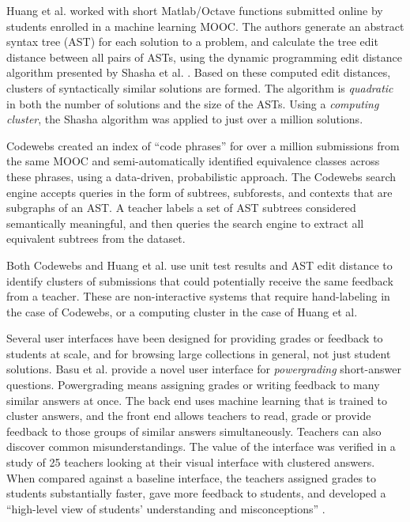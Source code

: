 \documentclass{sigchi}
\begin{document}
Huang et al. \citeyear{MOOCshop} worked with short Matlab/Octave functions submitted online by students enrolled in a machine learning MOOC. The authors generate an abstract syntax tree (AST) for each solution to a problem, and calculate the tree edit distance between all pairs of ASTs, using the dynamic programming edit distance algorithm presented by Shasha et al. \citeyear{shasha1994exact}. Based on these computed edit distances, clusters of syntactically similar solutions are formed. The algorithm is \emph{quadratic} in both the number of solutions and the size of the ASTs. Using a \emph{computing cluster}, the Shasha algorithm was applied to just over a million solutions. 

Codewebs \cite{codewebs} created an index of ``code phrases'' for over a million submissions from the same MOOC and semi-automatically identified equivalence classes across these phrases, using a data-driven, probabilistic approach. The Codewebs search engine accepts queries in the form of subtrees, subforests, and contexts that are subgraphs of an AST. A teacher labels a set of AST subtrees considered semantically meaningful, and then queries the search engine to extract all equivalent subtrees from the dataset. 

Both Codewebs \cite{codewebs} and Huang et al. \citeyear{MOOCshop} use unit test results and AST edit distance to identify clusters of submissions that could potentially receive the same feedback from a teacher. These are non-interactive systems that require hand-labeling in the case of Codewebs, or a computing cluster in the case of Huang et al. 

Several user interfaces have been designed for providing grades or feedback to students at scale, and for browsing large collections in general, not just student solutions. Basu et al. \citeyear{basupowergrading} provide a novel user interface for {\it powergrading} short-answer questions. Powergrading means assigning grades or writing feedback to many similar answers at once. The back end uses machine learning that is trained to cluster answers, and the front end allows teachers to read, grade or provide feedback to those groups of similar answers simultaneously. Teachers can also discover common misunderstandings. The value of the interface was verified in a study of 25 teachers looking at their visual interface with clustered answers. When compared against a baseline interface, the teachers assigned grades to students substantially faster, gave more feedback to students, and developed a ``high-level view of students' understanding and misconceptions'' \cite{basuDivideAndConquer}.
\end{document}
